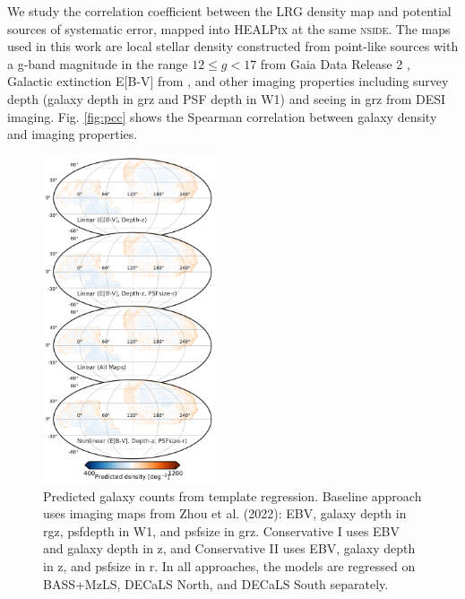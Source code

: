 We study the correlation coefficient between the LRG density map and potential sources of systematic error, mapped into \textsc{HEALPix} at the same \textsc{nside}. The maps used in this work are local stellar density constructed from point-like sources with a g-band magnitude in the range $12 \leq g < 17$ from Gaia Data Release 2 \citep[see,][]{gaiadr2, myers2022},  Galactic extinction E[B-V] from \cite{schlegel1998maps}, and other imaging properties including survey depth (galaxy depth in grz and PSF depth in W1) and seeing in grz from DESI imaging. Fig. \ref{fig:pcc} shows the Spearman correlation between galaxy density and imaging properties.

\begin{figure}
    \centering
    \includegraphics[width=0.45\textwidth]{figures/npred.pdf}
    \caption{Predicted galaxy counts from template regression. Baseline approach uses imaging maps from Zhou et al. (2022): EBV, galaxy depth in rgz, psfdepth in W1, and psfsize in grz. Conservative I uses EBV and galaxy depth in z, and Conservative II uses EBV, galaxy depth in z, and psfsize in r. In all approaches, the models are regressed on BASS+MzLS, DECaLS North, and DECaLS South separately.}
    \label{fig:npred}
\end{figure}

